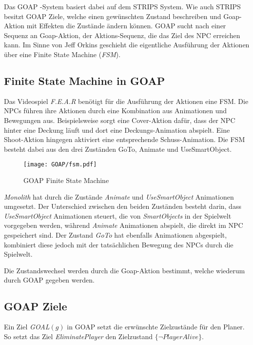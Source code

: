 Das GOAP -System basiert dabei auf dem STRIPS System. Wie auch STRIPS besitzt GOAP Ziele, welche einen gewünschten Zustand beschreiben und Goap-Aktion mit Effekten die Zustände ändern können. GOAP sucht nach einer Sequenz an Goap-Aktion, der Aktions-Sequenz, die das Ziel des NPC erreichen kann. Im Sinne von Jeff Orkins geschieht die eigentliche Ausführung der Aktionen über eine Finite State Machine (\textit{FSM}).


\subsection{Finite State Machine in GOAP}
\label{chap:fsm goap}

Das Videospiel \textit{F.E.A.R} benötigt für die Ausführung der Aktionen eine FSM. Die NPCs führen ihre Aktionen durch eine Kombination aus Animationen und Bewegungen aus. Beispielsweise sorgt eine Cover-Aktion dafür, dass der NPC hinter eine Deckung läuft und dort eine Deckungs-Animation abspielt. Eine Shoot-Aktion hingegen aktiviert eine entsprechende Schuss-Animation. Die FSM besteht dabei aus den drei Zuständen GoTo, Animate und UseSmartObject. 
\begin{figure}[h]
  \centering
  \texttt{[image: GOAP/fsm.pdf]}
	\captionsetup{justification=justified, format=plain}
  \caption{GOAP Finite State Machine}
  \label{fig:Goap FSM}
\end{figure}

\textit{Monolith} hat durch die Zustände \textit{Animate} und \textit{UseSmartObject} Animationen umgesetzt. Der Unterschied zwischen den beiden Zuständen besteht darin, dass \textit{UseSmartObject} Animationen steuert, die von \textit{SmartObjects} in der Spielwelt vorgegeben werden, während \textit{Animate} Animationen abspielt, die direkt im NPC gespeichert sind. Der Zustand \textit{GoTo} hat ebenfalls Animationen abgespielt, kombiniert diese jedoch mit der tatsächlichen Bewegung des NPCs durch die Spielwelt.

Die Zustandswechsel werden durch die Goap-Aktion bestimmt, welche wiederum durch GOAP gegeben werden.


\subsection{GOAP Ziele}
\label{chap:goap ziele}

Ein Ziel \textit{GOAL}$(g)$ in GOAP setzt die erwünschte Zielzustände für den Planer. So setzt das Ziel \textit{EliminatePlayer} den Zielzustand $\{\lnot \textit{PlayerAlive}\}$.

